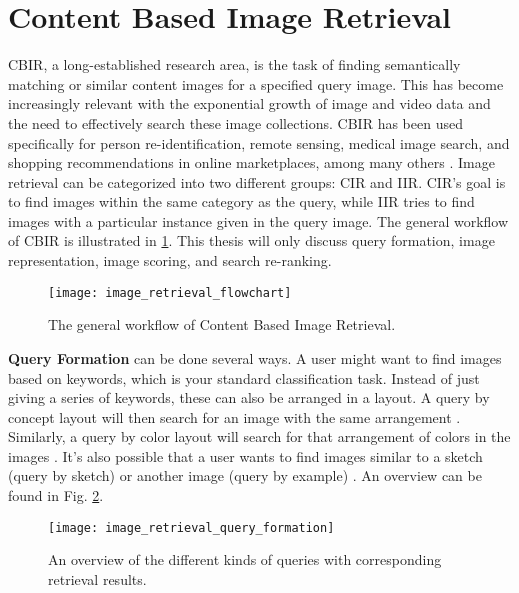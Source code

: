 \section{Content Based Image Retrieval}
\gls{CBIR}, a long-established research area, is the task of finding semantically matching or similar content images for a specified query image.
This has become increasingly relevant with the exponential growth of image and video data and the need to effectively search these image collections.
\gls{CBIR} has been used specifically for person re-identification, remote sensing, medical image search, and shopping recommendations in online marketplaces, among many others \cite{Chen2021a}.
Image retrieval can be categorized into two different groups: \gls{CIR} and \gls{IIR}.
\gls{CIR}'s goal is to find images within the same category as the query, while \gls{IIR} tries to find images with a particular instance given in the query image.
The general workflow of \gls{CBIR} is illustrated in \ref{fig:image_retrieval_flowchart}.
This thesis will only discuss query formation, image representation, image scoring, and search re-ranking.

\begin{figure}
	\centering
	\texttt{[image: image\_retrieval\_flowchart]}%
	\label{fig:image_retrieval_flowchart}
	\caption{
		The general workflow of Content Based Image Retrieval. \cite{Zhou2017}
	}
\end{figure}

\textbf{Query Formation} can be done several ways.
A user might want to find images based on keywords, which is your standard classification task.
Instead of just giving a series of keywords, these can also be arranged in a layout.
A query by concept layout will then search for an image with the same arrangement \cite{Xu2010}.
Similarly, a query by color layout will search for that arrangement of colors in the images \cite{Wang2011}.
It's also possible that a user wants to find images similar to a sketch (query by sketch) \cite{Cao2010} or another image (query by example) \cite{Radenovic2017}.
An overview can be found in Fig. \ref{fig:image_retrieval_query_formation}.

\begin{figure}[h]
	\centering
	\texttt{[image: image\_retrieval\_query\_formation]}%
	\caption{
		An overview of the different kinds of queries with corresponding retrieval results. \cite{Zhou2017}
	}
	\label{fig:image_retrieval_query_formation}
\end{figure}

